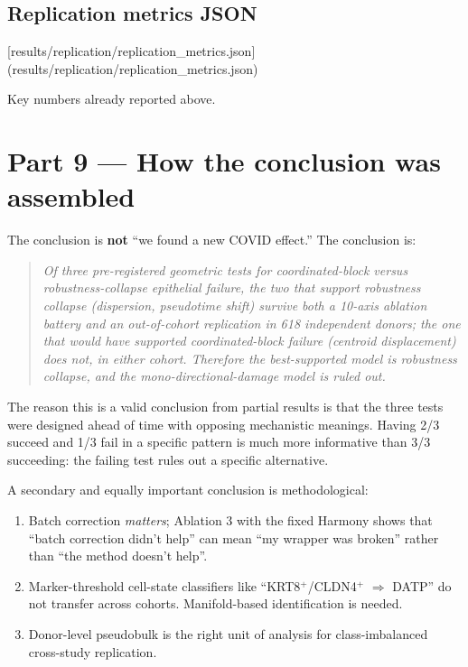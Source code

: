 \documentclass[11pt]{article}
\begin{document}
\subsection{Replication metrics JSON}

[results/replication/replication\_metrics.json](results/replication/replication_metrics.json)

Key numbers already reported above.

\section{Part 9 --- How the conclusion was assembled}

The conclusion is \textbf{not} ``we found a new COVID effect.'' The conclusion
is:

\begin{quote}
\emph{Of three pre-registered geometric tests for coordinated-block
versus robustness-collapse epithelial failure, the two that support
robustness collapse (dispersion, pseudotime shift) survive both a
10-axis ablation battery and an out-of-cohort replication in 618
independent donors; the one that would have supported
coordinated-block failure (centroid displacement) does not, in either
cohort. Therefore the best-supported model is robustness collapse,
and the mono-directional-damage model is ruled out.}
\end{quote}

The reason this is a valid conclusion from partial results is that the three
tests were designed ahead of time with opposing mechanistic meanings.
Having 2/3 succeed and 1/3 fail in a specific pattern is much more
informative than 3/3 succeeding: the failing test rules out a specific
alternative.

A secondary and equally important conclusion is methodological:

\begin{enumerate}
\item Batch correction \emph{matters}; Ablation 3 with the fixed Harmony
      shows that ``batch correction didn't help'' can mean ``my wrapper
      was broken'' rather than ``the method doesn't help''.
\item Marker-threshold cell-state classifiers like ``KRT8$^+$/CLDN4$^+$
      $\Rightarrow$ DATP'' do not transfer across cohorts. Manifold-based
      identification is needed.
\item Donor-level pseudobulk is the right unit of analysis for
      class-imbalanced cross-study replication.
\end{enumerate}
\end{document}
